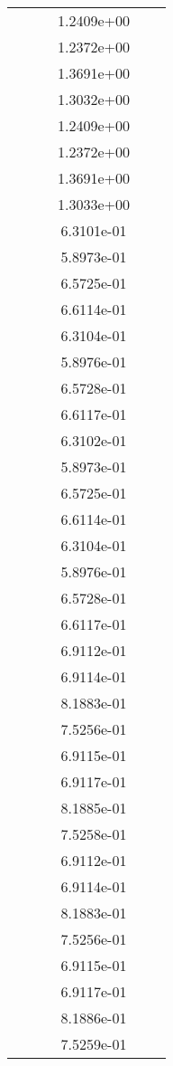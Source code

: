 \begin{xltabular}{\textwidth}{r|rS[table-format=1.3e+2]S[table-format=1.4e+2]S[table-format=1.4e+2]S[table-format=-1.5]}
&  &  & 1.2409e+00 & & \\
&  &  & 1.2372e+00 & & \\
&  &  & 1.3691e+00 & & \\
&  &  & 1.3032e+00 & & \\
&  &  & 1.2409e+00 & & \\
&  &  & 1.2372e+00 & & \\
&  &  & 1.3691e+00 & & \\
&  &  & 1.3033e+00 & & \\
&  &  & 6.3101e-01 & & \\
&  &  & 5.8973e-01 & & \\
&  &  & 6.5725e-01 & & \\
&  &  & 6.6114e-01 & & \\
&  &  & 6.3104e-01 & & \\
&  &  & 5.8976e-01 & & \\
&  &  & 6.5728e-01 & & \\
&  &  & 6.6117e-01 & & \\
&  &  & 6.3102e-01 & & \\
&  &  & 5.8973e-01 & & \\
&  &  & 6.5725e-01 & & \\
&  &  & 6.6114e-01 & & \\
&  &  & 6.3104e-01 & & \\
&  &  & 5.8976e-01 & & \\
&  &  & 6.5728e-01 & & \\
&  &  & 6.6117e-01 & & \\
&  &  & 6.9112e-01 & & \\
&  &  & 6.9114e-01 & & \\
&  &  & 8.1883e-01 & & \\
&  &  & 7.5256e-01 & & \\
&  &  & 6.9115e-01 & & \\
&  &  & 6.9117e-01 & & \\
&  &  & 8.1885e-01 & & \\
&  &  & 7.5258e-01 & & \\
&  &  & 6.9112e-01 & & \\
&  &  & 6.9114e-01 & & \\
&  &  & 8.1883e-01 & & \\
&  &  & 7.5256e-01 & & \\
&  &  & 6.9115e-01 & & \\
&  &  & 6.9117e-01 & & \\
&  &  & 8.1886e-01 & & \\
&  &  & 7.5259e-01 & & \\

\end{xltabular}
